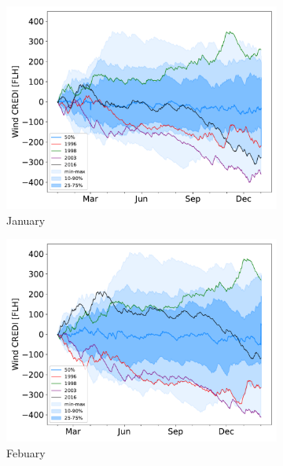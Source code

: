 \documentclass[12pt]{iopart}
\begin{document}
\begin{figure}[b]
\centering
\begin{subfigure}[t]{0.32\linewidth}
    \includegraphics[width=\linewidth]{Figures_SI/Fig_CUMSUM_YearStart_January}
    \caption{January }
\end{subfigure}
\begin{subfigure}[t]{0.32\linewidth}
    \includegraphics[width=\linewidth]{Figures_SI/Fig_CUMSUM_YearStart_February}
    \caption{Febuary }
\end{subfigure}
\begin{subfigure}[t]{0.32\linewidth}

\end{subfigure}
\end{figure}
\end{document}
